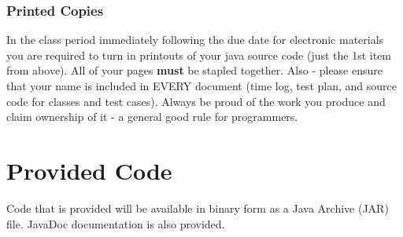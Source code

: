 \documentclass[11pt]{exam}
\begin{document}
\subsubsection*{Printed Copies}
In the class period immediately following the due date for electronic materials you are required to turn in printouts of your java source code (just the 1st item from above).  All of your pages {\bf must} be stapled together.  
\newline
Also - please ensure that your name is included in EVERY document (time log, test plan, and source code for classes and test cases).  Always be proud of the work you produce and claim ownership of it - a general good rule for programmers.

\section*{Provided Code}
Code that is provided will be available in binary form as a Java Archive (JAR) file.   JavaDoc documentation is also provided.
\end{document}
